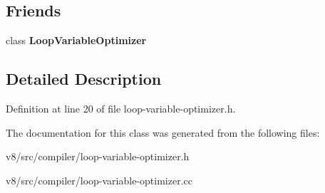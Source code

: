 \subsection*{Friends}
\begin{DoxyCompactItemize}
\item 
\mbox{\label{classv8_1_1internal_1_1compiler_1_1InductionVariable_adc47d99195b53f16f74e35f38d1b0981}} 
class {\bfseries Loop\+Variable\+Optimizer}
\end{DoxyCompactItemize}


\subsection{Detailed Description}


Definition at line 20 of file loop-\/variable-\/optimizer.\+h.



The documentation for this class was generated from the following files\+:\begin{DoxyCompactItemize}
\item 
v8/src/compiler/loop-\/variable-\/optimizer.\+h\item 
v8/src/compiler/loop-\/variable-\/optimizer.\+cc\end{DoxyCompactItemize}
